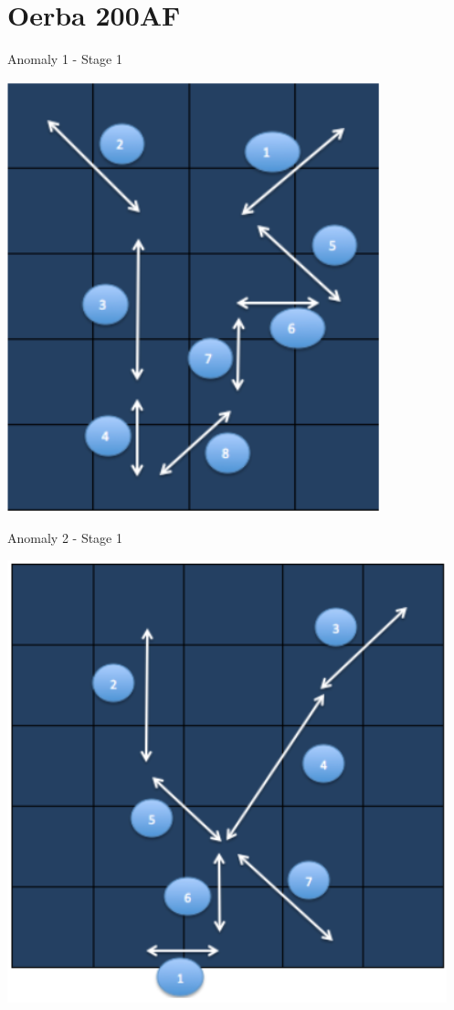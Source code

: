 \chapter{Oerba 200AF}


Anomaly 1 - Stage 1

\includegraphics{Images/anomaly1stage1}


Anomaly 2 - Stage 1

\includegraphics{Images/anomaly2stage1}

